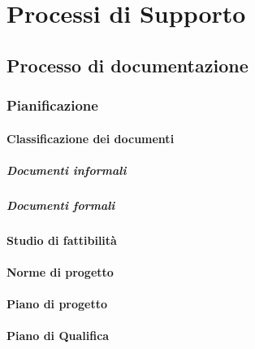 %


\section{Processi di Supporto}

	\subsection{Processo di documentazione}

		\subsubsection{Pianificazione}

			\paragraph{Classificazione dei documenti}
				
				\subparagraph{Documenti informali}
				
				\subparagraph{Documenti formali}

			\paragraph{Studio di fattibilità}

			\paragraph{Norme di progetto}

			\paragraph{Piano di progetto}

			\paragraph{Piano di Qualifica}

